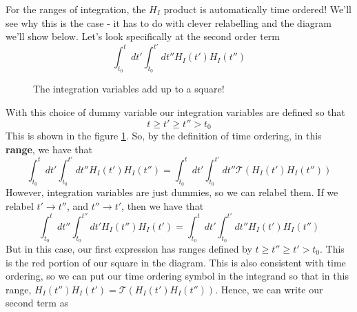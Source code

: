 \documentclass[11pt, oneside]{article}   	%
\theoremstyle{newline}
\theoremstyle{newline}
\theoremstyle{newline}
\theoremstyle{newline}
\theoremstyle{newline}
\begin{document}
For the ranges of integration, the $ H_I $ product is automatically time ordered! 
We'll see why this is the case - it has to do with clever relabelling and the diagram we'll show below. 
Let's look specifically at the second order term 
\[
\int_{ t_0 } ^ t dt' \int_{ t_0 } ^{ t' } dt'' H_{ I } ( t' ) H_{ I } ( t'' ) 
\]
\begin{figure}[h]
\centering 
{}
\caption{The integration variables add up to a square!} 
\label{fig:intAdd}
\end{figure}

With this choice of dummy variable our integration variables
are defined so that 
\[
t \ge t' \ge  t'' > t_0 
\] This is shown in the figure \ref{fig:intAdd}. 
So, by the definition of time ordering, in this \textbf{range}, 
we have that 
\[
\int_{ t_0 } ^ t dt' \int_{ t_0 } ^{ t' } dt'' H_{ I } ( t' ) H_{ I } ( t'' ) = \int_{ t_0 } ^ t dt' \int_{ t_0 } ^{ t' } dt'' \mathcal{ T } ( H_{ I } ( t' ) H_{ I } ( t'' ) ) \] However, integration variables are just dummies, so 
we can relabel them. If we relabel $ t' \to t''$, and 
$ t'' \to  t' $, then we have that 
\[
\int_{ t_0 } ^ t dt'' \int_{ t_0 } ^{ t'' } dt' H_{ I } ( t'' ) H_{ I } ( t' )  = \int_{ t_0 } ^ t dt' \int_{ t_0 } ^{ t' } dt'' H_{ I } ( t' ) H_{ I } ( t'' ) 
\] But in this case, our first expression has ranges defined by $ t \geq t'' \geq t' > t_0 $. 
This is the red portion of our square in 
the diagram. 
This is also consistent with time ordering, so we can put our time ordering symbol in the integrand 
so that in this range, $ H_{ I } (t'') H_{ I  }  ( t' ) = \mathcal{ T } ( H _I ( t' ) H _ I ( t'' ) ) $.  
Hence, we can write our second term as 
\end{document}
